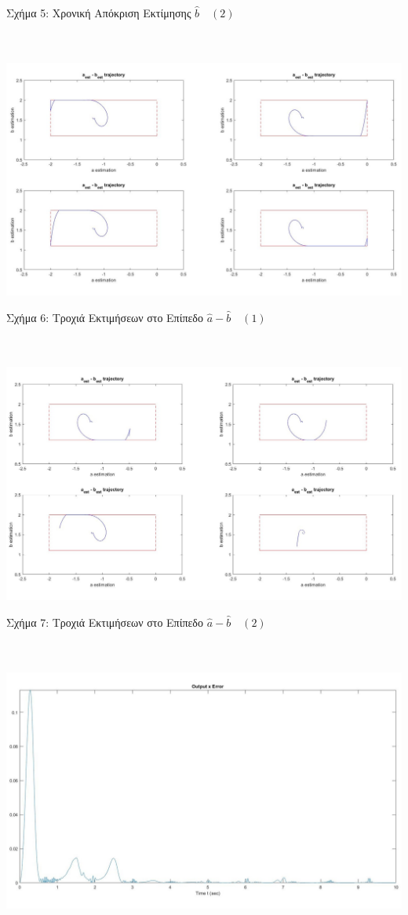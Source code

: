 \documentclass[12pt]{article}
\begin{document}
\centerline{Σχήμα 5: Χρονική Απόκριση Εκτίμησης $\hat{b} \quad (2)$}
\\ \\
\includegraphics[width=\linewidth]{ab_est_a1.jpg}
\centerline{Σχήμα 6: Τροχιά Εκτιμήσεων στο Επίπεδο $\hat{a} - \hat{b} \quad (1)$}
\\ \\
\includegraphics[width=\linewidth]{ab_est_a2.jpg}
\centerline{Σχήμα 7: Τροχιά Εκτιμήσεων στο Επίπεδο $\hat{a} - \hat{b} \quad (2)$}
\\ \\
\includegraphics[width=\linewidth]{errorA.jpg}
\end{document}
